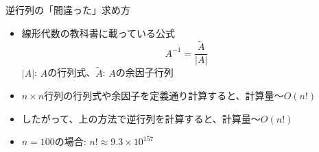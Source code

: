 \begin{frame}[t,fragile]{逆行列の「間違った」求め方}
  \begin{itemize}
  \item 線形代数の教科書に載っている公式
    \[
    A^{-1} = \frac{\tilde{A}}{|A|}
    \]
    $|A|$: $A$の行列式、$\tilde{A}$: $A$の余因子行列
  \item $n \times n$行列の行列式や余因子を定義通り計算すると、計算量〜$O(n!)$
  \item したがって、上の方法で逆行列を計算すると、計算量〜$O(n!)$
  \item $n=100$の場合: $n! \approx 9.3 \times 10^{157}$
  \end{itemize}
\end{frame}
